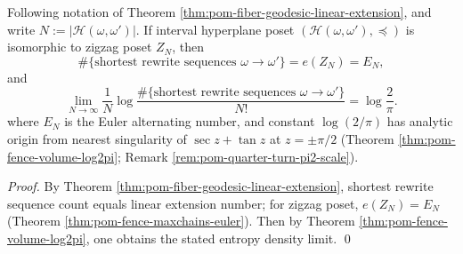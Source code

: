 \begin{corollary}\label{cor:pom-fiber-geodesic-log2pi}
Following notation of Theorem \ref{thm:pom-fiber-geodesic-linear-extension}, and write \(N:=|\mathcal H(\omega,\omega')|\).
If interval hyperplane poset \((\mathcal H(\omega,\omega'),\preceq)\) is isomorphic to zigzag poset \(Z_N\), then
\[
\#\{\text{shortest rewrite sequences } \omega\to \omega'\}=e(Z_N)=E_N,
\]
and
\[
\lim_{N\to\infty}\frac{1}{N}\log\frac{\#\{\text{shortest rewrite sequences } \omega\to \omega'\}}{N!}
=\log\frac{2}{\pi}.
\]
where \(E_N\) is the Euler alternating number, and constant \(\log(2/\pi)\) has analytic origin from nearest singularity of \(\sec z+\tan z\) at \(z=\pm\pi/2\) (Theorem \ref{thm:pom-fence-volume-log2pi}; Remark \ref{rem:pom-quarter-turn-pi2-scale}).
\end{corollary}
\begin{proof}
By Theorem \ref{thm:pom-fiber-geodesic-linear-extension}, shortest rewrite sequence count equals linear extension number; for zigzag poset, \(e(Z_N)=E_N\) (Theorem \ref{thm:pom-fence-maxchains-euler}).
Then by Theorem \ref{thm:pom-fence-volume-log2pi}, one obtains the stated entropy density limit. \qed
\end{proof}
